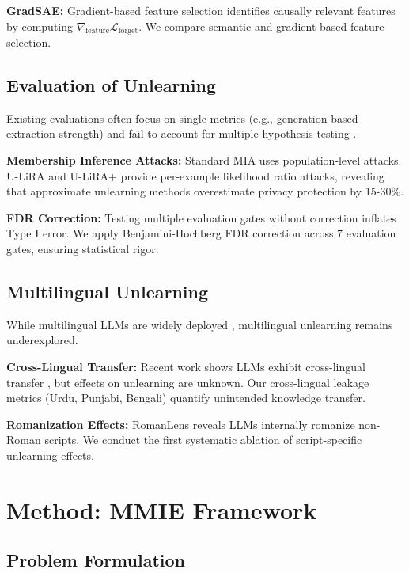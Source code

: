 \documentclass[11pt]{article}
\begin{document}
\textbf{GradSAE:} Gradient-based feature selection \cite{gradsae2025} identifies causally relevant features by computing $\nabla_{\text{feature}} \mathcal{L}_{\text{forget}}$. We compare semantic and gradient-based feature selection.

\subsection{Evaluation of Unlearning}

Existing evaluations often focus on single metrics (e.g., generation-based extraction strength) and fail to account for multiple hypothesis testing \cite{hayes2024inexact}.

\textbf{Membership Inference Attacks:} Standard MIA \cite{shokri2017membership} uses population-level attacks. U-LiRA \cite{hayes2024inexact} and U-LiRA+ provide per-example likelihood ratio attacks, revealing that approximate unlearning methods overestimate privacy protection by 15-30\%.

\textbf{FDR Correction:} Testing multiple evaluation gates without correction inflates Type I error. We apply Benjamini-Hochberg FDR correction \cite{benjamini1995controlling} across 7 evaluation gates, ensuring statistical rigor.

\subsection{Multilingual Unlearning}

While multilingual LLMs are widely deployed \cite{ustun2024aya,scao2022bloom}, multilingual unlearning remains underexplored.

\textbf{Cross-Lingual Transfer:} Recent work shows LLMs exhibit cross-lingual transfer \cite{pfeiffer2022lifting}, but effects on unlearning are unknown. Our cross-lingual leakage metrics (Urdu, Punjabi, Bengali) quantify unintended knowledge transfer.

\textbf{Romanization Effects:} RomanLens \cite{wendler2024romanlens} reveals LLMs internally romanize non-Roman scripts. We conduct the first systematic ablation of script-specific unlearning effects.

\section{Method: MMIE Framework}

\subsection{Problem Formulation}
\end{document}

